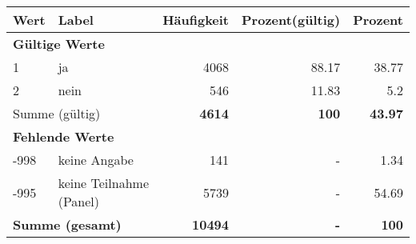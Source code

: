      \begin{longtable}{lXrrr}
     \toprule
     \textbf{Wert} & \textbf{Label} & \textbf{Häufigkeit} & \textbf{Prozent(gültig)} & \textbf{Prozent} \\
     \endhead
     \midrule
     \multicolumn{5}{l}{\textbf{Gültige Werte}}\\

     1 &
     \multicolumn{1}{X}{ ja   } &


       \num{4068} &
       \num[round-mode=places,round-precision=2]{88,17} &
         \num[round-mode=places,round-precision=2]{38,77} \\

     2 &
     \multicolumn{1}{X}{ nein   } &


       \num{546} &
       \num[round-mode=places,round-precision=2]{11,83} &
         \num[round-mode=places,round-precision=2]{5,2} \\
     \midrule
     \multicolumn{2}{l}{Summe (gültig)} &
       \textbf{\num{4614}} &
     \textbf{100} &
       \textbf{\num[round-mode=places,round-precision=2]{43,97}} \\
     \multicolumn{5}{l}{\textbf{Fehlende Werte}}\\
       -998 &
       keine Angabe &
         \num{141} &
        - &
         \num[round-mode=places,round-precision=2]{1,34} \\
       -995 &
       keine Teilnahme (Panel) &
         \num{5739} &
        - &
         \num[round-mode=places,round-precision=2]{54,69} \\
     \midrule
     \multicolumn{2}{l}{\textbf{Summe (gesamt)}} &
          \textbf{\num{10494}} &
        \textbf{-} &
        \textbf{100} \\
     \bottomrule
     \end{longtable}
     
